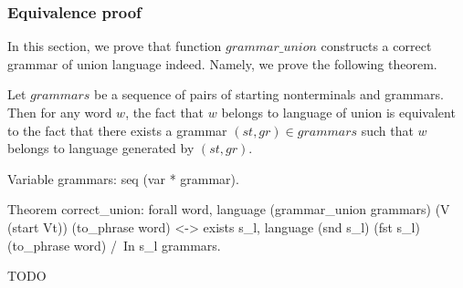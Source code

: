\subsubsection{Equivalence proof}

In this section, we prove that function $grammar\_union$ constructs a correct grammar of union language indeed. Namely, we prove the following theorem.


\begin{theorem}\label{theorem-correct-union}
    Let $grammars$ be a sequence of pairs of starting nonterminals and grammars. Then for any word $w$, the fact that $w$ belongs to language of union is equivalent to the fact that there exists a grammar $(st,gr) \in grammars$ such that $w$ belongs to language generated by $(st,gr)$.
\end{theorem}

\begin{listing}[h]
    \begin{pyglist}[language=coq, numbers=none, numbersep=5pt]
  Variable grammars: seq (var * grammar).

  Theorem correct_union:
    forall word, 
      language (grammar_union grammars) 
        (V (start Vt)) (to_phrase word) <->
      exists s_l, 
        language (snd s_l) (fst s_l) 
          (to_phrase word) /\ 
        In s_l grammars.
    \end{pyglist}
    \caption{TODO}
    \label{lst:verbments1}
\end{listing}


